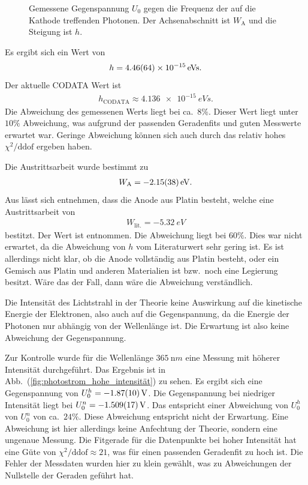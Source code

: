 \documentclass[sn-mathphys-num,iicol]{sn-jnl}
\theoremstyle{thmstyleone}
\theoremstyle{thmstyletwo}
\theoremstyle{thmstylethree}
\begin{document}
\begin{figure}[t]
        \centering
        \resizebox{.5\textwidth}{!}{}
        \caption{Gemessene Gegenspannung $U_0$ gegen die Frequenz der auf die Kathode treffenden Photonen. Der Achsenabschnitt ist $W_\text{A}$ und die Steigung ist $h$.} \label{fig:austrittsarbeit}
\end{figure}
Es ergibt sich ein Wert von
\begin{align} 
        h=\SI{4.46+-0.64e-15}{eVs}
.\end{align} 
Der aktuelle CODATA\cite{CODATA} Wert ist
\begin{align} 
        h_\text{CODATA}\approx \SI{4.136e-15}{eVs}
.\end{align} 
Die Abweichung des gemessenen Werts liegt bei ca.\ $8\%$.
Dieser Wert liegt unter $10\%$ Abweichung, was aufgrund der passenden Geradenfits und guten Messwerte erwartet war.
Geringe Abweichung können sich auch durch das relativ hohes $\chi ^2/\text{ddof}$ ergeben haben.

Die Austrittsarbeit wurde bestimmt zu
\begin{align} 
        W_\text{A}=\SI{-2.15+-0.38}{eV}
.\end{align} 
Aus \cite{LeyboldPhotoeffekt} lässt sich entnehmen, dass die Anode aus Platin besteht, welche eine Austrittsarbeit von 
\begin{align} 
        W_\text{lit.}=\SI{-5.32}{eV}
\end{align} 
bestitzt.
Der Wert ist \cite{SpektrumPhysik} entnommen.
Die Abweichung liegt bei $60\%$.
Dies war nicht erwartet, da die Abweichung von $h$ vom Literaturwert sehr gering ist.
Es ist allerdings nicht klar, ob die Anode vollständig aus Platin besteht, oder ein Gemisch aus Platin und anderen Materialien ist bzw.\ noch eine Legierung besitzt.
Wäre das der Fall, dann wäre die Abweichung verständlich.

Die Intensität des Lichtstrahl in der Theorie keine Auswirkung auf die kinetische Energie der Elektronen, also auch auf die Gegenspannung, da die Energie der Photonen nur abhängig von der Wellenlänge ist.
Die Erwartung ist also keine Abweichung der Gegenspannung.

Zur Kontrolle wurde für die Wellenlänge $\SI{365}{\nano m}$ eine Messung mit höherer Intensität durchgeführt.
Das Ergebnis ist in Abb.\ (\ref{fig:photostrom_hohe_intensität}) zu sehen.
Es ergibt sich eine Gegenspannung von $U_0^h=-\SI{1.87+-.1}{V}$.
Die Gegenspannung bei niedriger Intensität liegt bei $U_0^n=\SI{-1.509+-.017}{V}$.
Das entspricht einer Abweichung von $U_0^h$ von $U_0^n$ von ca.\ $24\%$.
Diese Abweichung entspricht nicht der Erwartung.
Eine Abweichung ist hier allerdings keine Anfechtung der Theorie, sondern eine ungenaue Messung.
Die Fitgerade für die Datenpunkte bei hoher Intensität hat eine Güte von $\chi ^2/\text{ddof}\approx 21$, was für einen passenden Geradenfit zu hoch ist.
Die Fehler der Messdaten wurden hier zu klein gewählt, was zu Abweichungen der Nullstelle der Geraden geführt hat.
\end{document}

